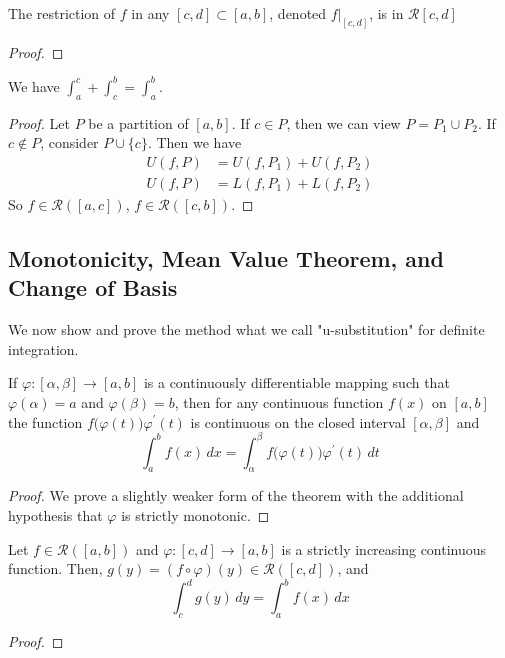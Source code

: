   \begin{theorem}
    The restriction of $f$ in any $[c, d] \subset [a, b]$, denoted $f \big|_{[c,d]}$, is in $\mathcal{R}[c,d]$
  \end{theorem}
  \begin{proof}
    
  \end{proof}

  \begin{theorem}
    We have $\int_a^c + \int_c^b = \int_a^b$. 
  \end{theorem}
  \begin{proof}
    Let $P$ be a partition of $[a, b]$. If $c \in P$, then we can view $P = P_1 \cup P_2$. If $c \not\in P$, consider $P \cup \{c\}$. Then we have 
    \begin{align}
      U(f, P) & = U(f, P_1) + U(f, P_2) \\ 
      U(f, P) & = L(f, P_1) + L(f, P_2) 
    \end{align}
    So $f \in \mathcal{R}([a, c])$, $f \in \mathcal{R}([c, b])$. 
  \end{proof}

\subsection{Monotonicity, Mean Value Theorem, and Change of Basis}  

  We now show and prove the method what we call "u-substitution" for definite integration. 

  \begin{theorem}
    If $\varphi: [\alpha, \beta] \longrightarrow [a, b]$ is a continuously differentiable mapping such that $\varphi(\alpha) = a$ and $\varphi(\beta) = b$, then for any continuous function $f(x)$ on $[a, b]$ the function $f\big(\varphi(t)\big) \varphi^\prime (t)$ is continuous on the closed interval $[\alpha, \beta]$ and 
    \[\int_a^b f(x)\,dx = \int_\alpha^\beta f\big(\varphi(t)\big) \varphi^\prime(t)\,dt\]
  \end{theorem}
  \begin{proof}
    We prove a slightly weaker form of the theorem with the additional hypothesis that $\varphi$ is strictly monotonic. 
  \end{proof}

  \begin{theorem}
    Let $f \in \mathcal{R}([a, b])$ and $\varphi: [c, d] \to [a, b]$ is a strictly increasing continuous function. Then, $g(y) = (f \circ \varphi)(y) \in \mathcal{R}([c, d])$, and 
    \begin{equation}
      \int_c^d g(y) \,dy = \int_a^b f(x) \,dx
    \end{equation}
  \end{theorem}
  \begin{proof}
    
  \end{proof}


